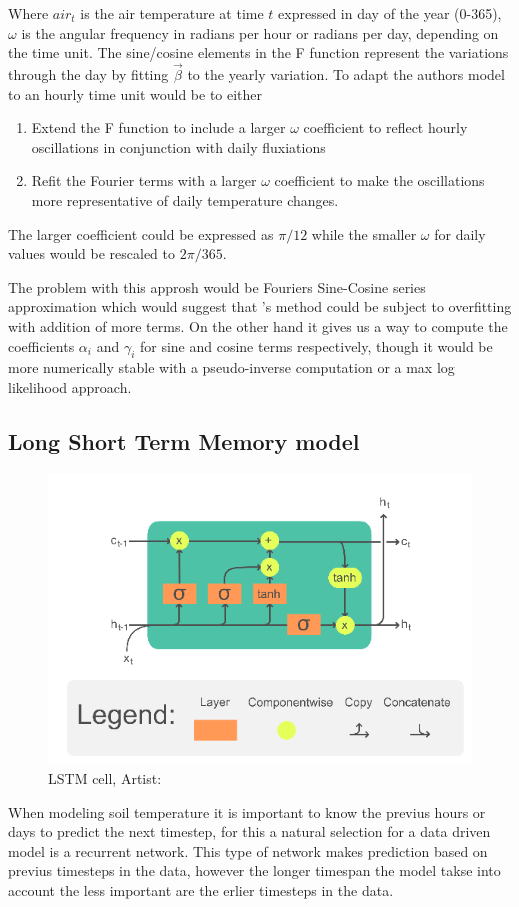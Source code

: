 Where $air_t$ is the air temperature at time $t$ expressed in day of the year (0-365), $\omega$ is the angular frequency in radians per hour or radians per day, depending on the time unit. The sine/cosine elements in the F function represent the variations through the day by fitting $\vec{\beta}$ to the yearly variation. To adapt the authors model to an hourly time unit would be to either
\begin{enumerate}
	\item Extend the F function to include a larger $\omega$ coefficient to reflect hourly oscillations in conjunction with daily fluxiations
	\item Refit the Fourier terms with a larger $\omega$ coefficient to make the oscillations more representative of daily temperature changes.
\end{enumerate}

The larger coefficient could be expressed as $\pi/12$ while the smaller $\omega$ for daily values would be rescaled to $2\pi/365$.

The problem with this approsh would be Fouriers Sine-Cosine series approximation which would suggest that \citeauthor{plauborg_simple_2002}'s method could be subject to overfitting with addition of more terms. On the other hand it gives us a way to compute the coefficients $\alpha_i$ and $\gamma_i$ for sine and cosine terms respectively, though it would be more numerically stable with a pseudo-inverse computation or a max log likelihood approach.


\subsection{Long Short Term Memory model}\label{sec:theory:lstm}
\begin{figure}[ht]
	\centering
	\includegraphics[width=0.7\linewidth]{figures/LSTM_Cell}
	\caption{LSTM cell,  Artist: \textcite{chevalier_english_2018}}
	\label{fig:lstmcell}
\end{figure}
When modeling soil temperature it is important to know the previus hours or days to predict the next timestep, for this a natural selection for a data driven model is a recurrent network. This type of network makes prediction based on previus timesteps in the data, however the longer timespan the model takse into account the less important are the erlier timesteps in the data. 

